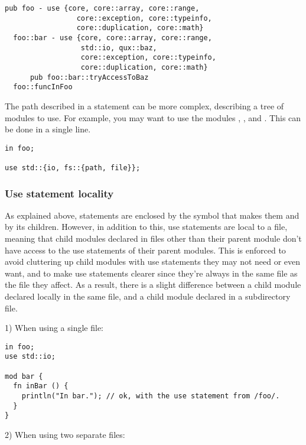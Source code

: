 \begin{lstlisting}[caption=\textit{foo.yr.ydump-decls.1}, style=bashVerb, escapechar=@+]
  pub foo - use {core, core::array, core::range,
                 core::exception, core::typeinfo,
                 core::duplication, core::math}
  foo::bar - use {core, core::array, core::range,
                  std::io, qux::baz,
                  core::exception, core::typeinfo,
                  core::duplication, core::math}
      pub foo::bar::tryAccessToBaz
  foo::funcInFoo
\end{lstlisting}

The path described in a  statement can be more complex, describing a
tree of modules to use. For example, you may want to use the modules
, , and . This can
be done in a single line.

\begin{lstlisting}[style=coloredverbatim]
in foo;

use std::{io, fs::{path, file}};
\end{lstlisting}

\subsubsection*{Use statement locality}

As explained above,  statements are enclosed by the symbol that
makes them and by its children. However, in addition to this, use statements are
local to a file, meaning that child modules declared in files other than their
parent module don't have access to the use statements of their parent modules.
This is enforced to avoid cluttering up child modules with use statements they
may not need or even want, and to make use statements clearer since they're
always in the same file as the file they affect. As a result, there is a slight
difference between a child module declared locally in the same file, and a child
module declared in a subdirectory file.
\smallskip

1) When using a single file:

\begin{lstlisting}[caption=\textit{./foo.yr}, style=coloredverbatim]
in foo;
use std::io;

mod bar {
  fn inBar () {
    println("In bar."); // ok, with the use statement from /foo/.
  }
}
\end{lstlisting}

2) When using two separate files:

